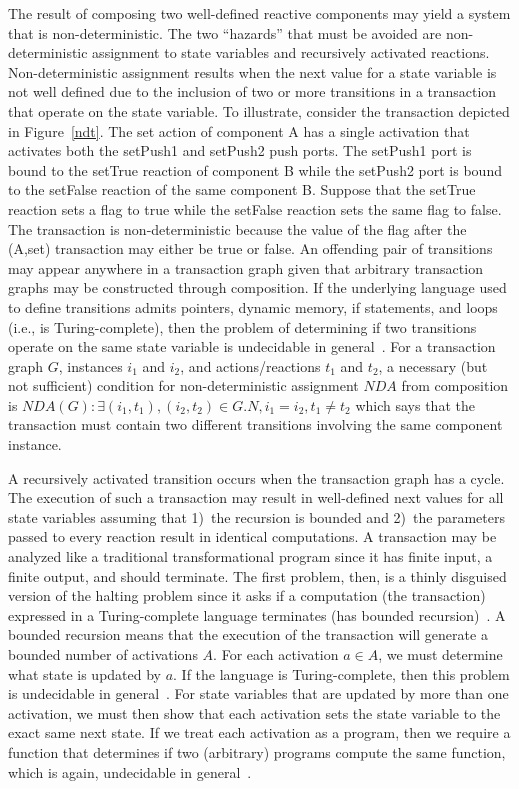 The result of composing two well-defined reactive components may yield a system that is non-deterministic.
The two ``hazards'' that must be avoided are non-deterministic assignment to state variables and recursively activated reactions.
Non-deterministic assignment results when the next value for a state variable is not well defined due to the inclusion of two or more transitions in a transaction that operate on the state variable.
To illustrate, consider the transaction depicted in Figure~\ref{ndt}.
The set action of component A has a single activation that activates both the setPush1 and setPush2 push ports.
The setPush1 port is bound to the setTrue reaction of component B while the setPush2 port is bound to the setFalse reaction of the same component B.
Suppose that the setTrue reaction sets a flag to true while the setFalse reaction sets the same flag to false.
The transaction is non-deterministic because the value of the flag after the (A,set) transaction may either be true or false.
An offending pair of transitions may appear anywhere in a transaction graph given that arbitrary transaction graphs may be constructed through composition.
If the underlying language used to define transitions admits pointers, dynamic memory, if statements, and loops (i.e., is Turing-complete), then the problem of determining if two transitions operate on the same state variable is undecidable in general~\cite{Landi:1992:USA:161494.161501, Ramalingam:1994:UA:186025.186041}.
For a transaction graph $G$, instances $i_1$ and $i_2$, and actions/reactions $t_1$ and $t_2$, a necessary (but not sufficient) condition for non-deterministic assignment $\mathit{NDA}$ from composition is $\mathit{NDA}(G): \exists (i_1, t_1), (i_2, t_2) \in G.N, i_1 = i_2, t_1 \ne t_2$ which says that the transaction must contain two different transitions involving the same component instance.

A recursively activated transition occurs when the transaction graph has a cycle.
The execution of such a transaction may result in well-defined next values for all state variables assuming that 1)~the recursion is bounded and 2)~the parameters passed to every reaction result in identical computations.
A transaction may be analyzed like a traditional transformational program since it has finite input, a finite output, and should terminate.
The first problem, then, is a thinly disguised version of the halting problem since it asks if a computation (the transaction) expressed in a Turing-complete language terminates (has bounded recursion)~\cite{Turing01011937, davis1958computability}.
A bounded recursion means that the execution of the transaction will generate a bounded number of activations $A$.
For each activation $a \in A$, we must determine what state is updated by $a$.
If the language is Turing-complete, then this problem is undecidable in general~\cite{Landi:1992:USA:161494.161501, Ramalingam:1994:UA:186025.186041}.
For state variables that are updated by more than one activation, we must then show that each activation sets the state variable to the exact same next state.
If we treat each activation as a program, then we require a function that determines if two (arbitrary) programs compute the same function, which is again, undecidable in general~\cite{Rice:53}.

